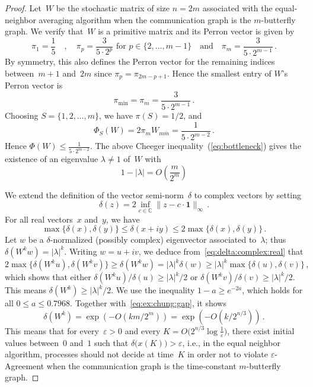\documentclass[a4paper]{article}
\theoremstyle{newthm}
\newcommand{\IC}{\mathds{C}}
\newcommand{\onevec}{{\mathbf{1}}}
\renewcommand{\leq}{\leqslant}
\renewcommand{\geq}{\geqslant}
\begin{document}
\begin{proof}
Let~$W$ be the stochastic matrix of size $n=2m$ associated with the equal-neighbor averaging 
	algorithm when the communication graph is the $m$-butterfly graph.
We verify that~$W$ is a primitive matrix and its Perron vector is given by
\begin{equation*}\label{eq:ex:chung:pi}
\pi_1 = \frac{1}{5}
\quad,
\quad
\pi_p = 
\frac{3}{5\cdot 2^{p}} \text{ for } p\in\{2,\dots,m-1\}
\quad\text{and}\quad
\pi_m = \frac{3}{5\cdot 2^{m-1}} \, .
\end{equation*}
By symmetry, this also defines the Perron vector for the
remaining indices between~$m+1$ and~$2m$ since $\pi_p =
\pi_{2m - p +1}$. 
Hence the smallest entry of $W$'s Perron vector is 
	$$\pi_{\min} = \pi_m = \frac{3}{5 \cdot 2^{m-1}} \, .$$
Choosing $S = \{1,2,\dots,m\}$, we have  $\pi (S) = 1/2 $, and
	$$\Phi_S(W) = 2 \pi_m W_{m\bar{m}} = \frac{1}{5\cdot 2^{m-2}} \, .$$
Hence 
	$\Phi(W) \leq \frac{1}{5\cdot 2^{m-2}} $.
The above Cheeger inequality~(\ref{eq:bottleneck}) gives the existence of an eigenvalue
	$\lambda\neq1$ of~$W$ with 
\begin{equation}\label{eq:ex:chung:gap}
1 - \lvert \lambda\rvert
=
O\left( \frac{m}{2^m} \right)
\end{equation}

We extend the definition of the vector semi-norm~$\delta$ to complex
	vectors by setting
	$$\delta(z) = 2\inf_{c\in\IC} \lVert z - c\cdot \onevec \rVert_\infty \, .$$ 
For all real vectors~$x$ and~$y$, we have
\begin{equation}\label{eq:delta:complex:real}
\max\{ \delta(x) , \delta(y) \}
\leq
\delta(x + iy)
\leq
2\max\{ \delta(x) , \delta(y) \} \, .
\end{equation}
Let $w$ be a $\delta$-normalized (possibly complex)
	eigenvector associated to~$\lambda$; thus
	$\delta(W^k w) = \lvert\lambda\rvert^k$.
Writing $w=u + iv$, we deduce from~\eqref{eq:delta:complex:real} that
	\begin{equation*}
	2\max\{\delta(W^k u),\delta(W^k v)\} \geq \delta(W^k w) = \lvert \lambda\rvert^k \delta(w)
	\geq  \lvert \lambda \rvert^k \max \{\delta(u),\delta(v)\} \, ,
	\end{equation*}
	which shows that either $\delta(W^k u)/\delta(u) \geq \lvert \lambda \rvert^k/2$
	or $\delta(W^k v)/\delta(v) \geq \lvert \lambda \rvert^k/2$.
This means $\delta(W^k) \geq \lvert \lambda\rvert^k/2$.
We use the inequality $1-a \geq e^{-2{a}}$, which holds for all $0\leq a \leq 0.7968$.
Together with~\eqref{eq:ex:chung:gap}, it shows
	\begin{equation*}
	\delta(W^k) = \exp\left(-O(k{m}/2^{m})\right) =  \exp\left(-O(k/2^{n/3})\right)
	\, .
	\end{equation*}
This means that for every~$\varepsilon>0$ and every $K = O\big( 2^{n/3} \log\frac{1}{\varepsilon} \big)$, 
	there exist initial values between~$0$ and~$1$ such that $\delta\big( x(K) \big) > \varepsilon$, i.e., 
	in the equal neighbor algorithm, processes should not decide at time~$K$ in order not to violate 
	$\varepsilon$-Agreement when the communication graph is the time-constant $m$-butterfly graph.
\end{proof}
\end{document}
